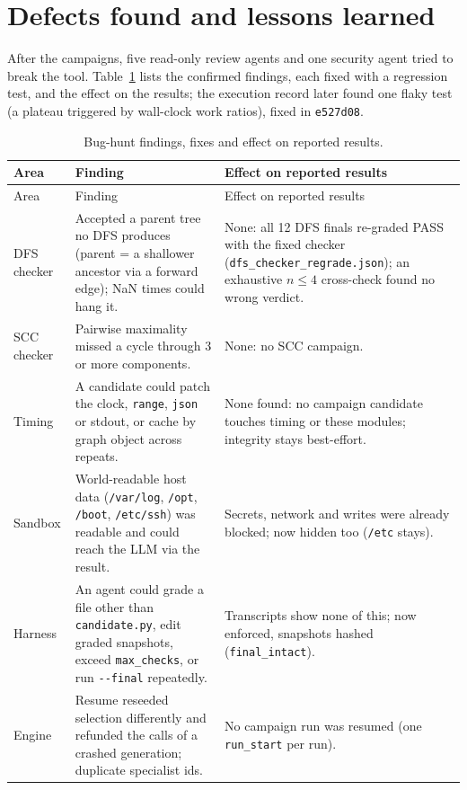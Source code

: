 \section{Defects found and lessons learned}
\label{sec:test-defects}

After the campaigns, five read-only review agents and one security agent tried
to break the tool. Table~\ref{tab:defects} lists the confirmed findings, each
fixed with a regression test, and the effect on the results; the execution
record later found one flaky test (a plateau triggered by wall-clock work ratios),
fixed in \texttt{e527d08}.

\begin{scriptsize}
\setlength{\tabcolsep}{4pt}
\begin{longtable}{@{}p{}p{}p{}@{}}
\caption{Bug-hunt findings, fixes and effect on reported results.}\label{tab:defects}\\
\toprule
Area & Finding & Effect on reported results \\
\midrule
\endfirsthead
\toprule
Area & Finding & Effect on reported results \\
\midrule
\endhead
DFS checker & Accepted a parent tree no DFS produces (parent = a shallower ancestor via a forward edge); NaN times could hang it. & None: all 12 DFS finals re-graded PASS with the fixed checker (\texttt{dfs\_checker\_regrade.json}); an exhaustive $n \le 4$ cross-check found no wrong verdict. \\
SCC checker & Pairwise maximality missed a cycle through 3 or more components. & None: no SCC campaign. \\
Timing & A candidate could patch the clock, \texttt{range}, \texttt{json} or stdout, or cache by graph object across repeats. & None found: no campaign candidate touches timing or these modules; integrity stays best-effort. \\
Sandbox & World-readable host data (\texttt{/var/log}, \texttt{/opt}, \texttt{/boot}, \texttt{/etc/ssh}) was readable and could reach the LLM via the result. & Secrets, network and writes were already blocked; now hidden too (\texttt{/etc} stays). \\
Harness & An agent could grade a file other than \texttt{candidate.py}, edit graded snapshots, exceed \texttt{max\_checks}, or run \texttt{-{}-final} repeatedly. & Transcripts show none of this; now enforced, snapshots hashed (\texttt{final\_intact}). \\
Engine & Resume reseeded selection differently and refunded the calls of a crashed generation; duplicate specialist ids. & No campaign run was resumed (one \texttt{run\_start} per run). \\

\end{longtable}
\end{scriptsize}
